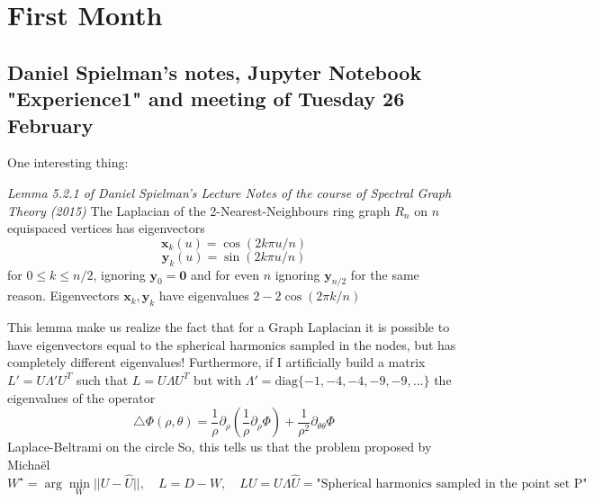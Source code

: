 \section{First Month}
\subsection{Daniel Spielman's notes, Jupyter Notebook "Experience1" and meeting of Tuesday 26 February}

One interesting thing:

\begin{theorem}{\textit{Lemma 5.2.1 of Daniel Spielman's Lecture Notes of the course of Spectral Graph Theory (2015)}}
	\label{theo:eigenvectors on the ring}
	The Laplacian of the 2-Nearest-Neighbours ring graph $R_n$ on $n$ equispaced vertices has eigenvectors
	$$\mathbf x_k(u) = \cos(2k\pi u/n)$$
	$$\mathbf y_k(u) = \sin(2k\pi u/n)$$
	for $0\leq k\leq n/2$, ignoring $\mathbf y_0 = \mathbf 0$ and for even $n$ ignoring $\mathbf y_{n/2}$ for the same reason. Eigenvectors $\mathbf x_k, \mathbf y_k$ have eigenvalues $2-2\cos(2\pi k/n)$
\end{theorem}

This lemma make us realize the fact that for a Graph Laplacian it is possible to have eigenvectors equal to the spherical harmonics sampled in the nodes, but has completely different eigenvalues! Furthermore, if I artificially build a matrix $L'=U\Lambda'U^T$ such that $L=U\Lambda U^T$ but with $\Lambda'=\text{diag}\{-1, -4, -4, -9, -9, ...\}$ the eigenvalues of the operator  
$$\triangle \Phi(\rho, \theta) = \frac{1}{\rho}\partial_\rho \left(\frac{1}{\rho}\partial_\rho \Phi\right) + \frac{1}{\rho^2}\partial_{\theta\theta}\Phi$$ 
Laplace-Beltrami on the circle  So, this tells us that the problem proposed by Micha\"el
\begin{equation}\label{eq:michaelsproblem}
	W^\star = \arg\min_W||U-\hat U||, \quad L=D-W,\quad LU=U\Lambda
	 \hat U = \text{"Spherical harmonics sampled in the point set P"}
\end{equation}

